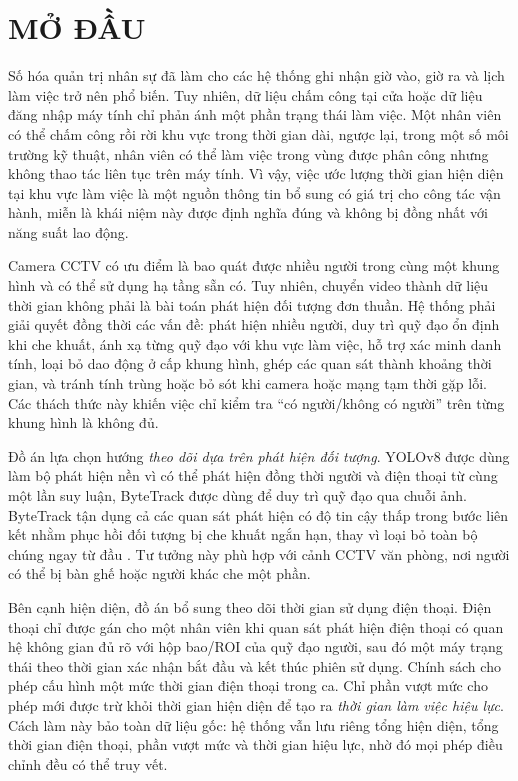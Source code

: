 \section*{MỞ ĐẦU}
Số hóa quản trị nhân sự đã làm cho các hệ thống ghi nhận giờ vào, giờ ra và lịch làm việc trở nên phổ biến. Tuy nhiên, dữ liệu chấm công tại cửa hoặc dữ liệu đăng nhập máy tính chỉ phản ánh một phần trạng thái làm việc. Một nhân viên có thể chấm công rồi rời khu vực trong thời gian dài, ngược lại, trong một số môi trường kỹ thuật, nhân viên có thể làm việc trong vùng được phân công nhưng không thao tác liên tục trên máy tính. Vì vậy, việc ước lượng thời gian hiện diện tại khu vực làm việc là một nguồn thông tin bổ sung có giá trị cho công tác vận hành, miễn là khái niệm này được định nghĩa đúng và không bị đồng nhất với năng suất lao động.

Camera CCTV có ưu điểm là bao quát được nhiều người trong cùng một khung hình và có thể sử dụng hạ tầng sẵn có. Tuy nhiên, chuyển video thành dữ liệu thời gian không phải là bài toán phát hiện đối tượng đơn thuần. Hệ thống phải giải quyết đồng thời các vấn đề: phát hiện nhiều người, duy trì quỹ đạo ổn định khi che khuất, ánh xạ từng quỹ đạo với khu vực làm việc, hỗ trợ xác minh danh tính, loại bỏ dao động ở cấp khung hình, ghép các quan sát thành khoảng thời gian, và tránh tính trùng hoặc bỏ sót khi camera hoặc mạng tạm thời gặp lỗi. Các thách thức này khiến việc chỉ kiểm tra ``có người/không có người'' trên từng khung hình là không đủ.

Đồ án lựa chọn hướng \textit{theo dõi dựa trên phát hiện đối tượng}. YOLOv8 được dùng làm bộ phát hiện nền vì có thể phát hiện đồng thời người và điện thoại từ cùng một lần suy luận, ByteTrack được dùng để duy trì quỹ đạo qua chuỗi ảnh. ByteTrack tận dụng cả các quan sát phát hiện có độ tin cậy thấp trong bước liên kết nhằm phục hồi đối tượng bị che khuất ngắn hạn, thay vì loại bỏ toàn bộ chúng ngay từ đầu \cite{bytetrack}. Tư tưởng này phù hợp với cảnh CCTV văn phòng, nơi người có thể bị bàn ghế hoặc người khác che một phần.

Bên cạnh hiện diện, đồ án bổ sung theo dõi thời gian sử dụng điện thoại. Điện thoại chỉ được gán cho một nhân viên khi quan sát phát hiện điện thoại có quan hệ không gian đủ rõ với hộp bao/ROI của quỹ đạo người, sau đó một máy trạng thái theo thời gian xác nhận bắt đầu và kết thúc phiên sử dụng. Chính sách cho phép cấu hình một mức thời gian điện thoại trong ca. Chỉ phần vượt mức cho phép mới được trừ khỏi thời gian hiện diện để tạo ra \textit{thời gian làm việc hiệu lực}. Cách làm này bảo toàn dữ liệu gốc: hệ thống vẫn lưu riêng tổng hiện diện, tổng thời gian điện thoại, phần vượt mức và thời gian hiệu lực, nhờ đó mọi phép điều chỉnh đều có thể truy vết.

